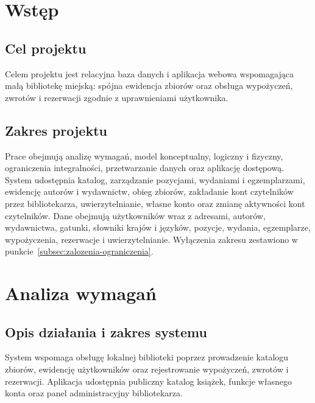 \documentclass[11pt, a4paper]{article}
\begin{document}
\tableofcontents
\newpage


\section{Wstęp}

\subsection{Cel projektu}


Celem projektu jest relacyjna baza danych i aplikacja webowa wspomagająca małą bibliotekę miejską: spójna ewidencja zbiorów oraz obsługa wypożyczeń, zwrotów i rezerwacji zgodnie z uprawnieniami użytkownika.

\subsection{Zakres projektu}


Prace obejmują analizę wymagań, model konceptualny, logiczny i fizyczny, ograniczenia integralności, przetwarzanie danych oraz aplikację dostępową. System udostępnia katalog, zarządzanie pozycjami, wydaniami i egzemplarzami, ewidencję autorów i wydawnictw, obieg zbiorów, zakładanie kont czytelników przez bibliotekarza, uwierzytelnianie, własne konto oraz zmianę aktywności kont czytelników. Dane obejmują użytkowników wraz z adresami, autorów, wydawnictwa, gatunki, słowniki krajów i języków, pozycje, wydania, egzemplarze, wypożyczenia, rezerwacje i uwierzytelnianie. Wyłączenia zakresu zestawiono w punkcie~\ref{subsec:zalozenia-ograniczenia}.


\section{Analiza wymagań}
\label{sec:analiza-wymagan}

\subsection{Opis działania i zakres systemu}
\label{subsec:opis-systemu}

System wspomaga obsługę lokalnej biblioteki poprzez prowadzenie katalogu zbiorów, ewidencję użytkowników oraz rejestrowanie wypożyczeń, zwrotów i rezerwacji. Aplikacja udostępnia publiczny katalog książek, funkcje własnego konta oraz panel administracyjny bibliotekarza.
\end{document}
